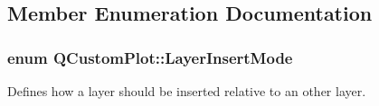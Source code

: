 \subsection{Member Enumeration Documentation}
\subsubsection[{\texorpdfstring{Layer\+Insert\+Mode}{LayerInsertMode}}]{\setlength{\rightskip}{0pt plus 5cm}enum {\bf Q\+Custom\+Plot\+::\+Layer\+Insert\+Mode}}\hypertarget{class_q_custom_plot_a75a8afbe6ef333b1f3d47abb25b9add7}{}\label{class_q_custom_plot_a75a8afbe6ef333b1f3d47abb25b9add7}
Defines how a layer should be inserted relative to an other layer.

